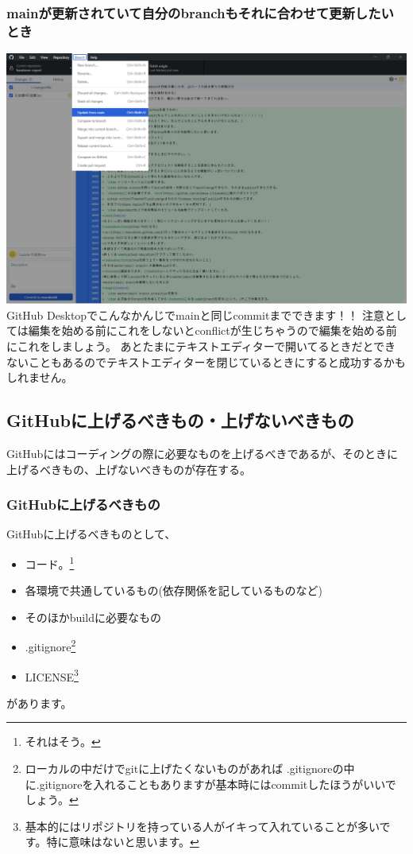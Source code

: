 \documentclass[dvipdfmx,jb5]{jarticle}
\begin{document}
\subsubsection{mainが更新されていて自分のbranchもそれに合わせて更新したいとき}
\includegraphics[width=15cm]{assets/update-branch.png}\\
GitHub Desktopでこんなかんじでmainと同じcommitまでできます！！
注意としては編集を始める前にこれをしないとconflictが生じちゃうので編集を始める前にこれをしましょう。
あとたまにテキストエディターで開いてるときだとできないこともあるのでテキストエディターを閉じているときにすると成功するかもしれません。
\subsection{GitHubに上げるべきもの・上げないべきもの}
GitHubにはコーディングの際に必要なものを上げるべきであるが、そのときに上げるべきもの、上げないべきものが存在する。
\subsubsection{GitHubに上げるべきもの}
GitHubに上げるべきものとして、
\begin{itemize}
  \item コード。\footnote{それはそう。}
  \item 各環境で共通しているもの(依存関係を記しているものなど)
  \item そのほかbuildに必要なもの
  \item .gitignore\footnote{ローカルの中だけでgitに上げたくないものがあれば
  .gitignoreの中に.gitignoreを入れることもありますが基本時にはcommitしたほうがいいでしょう。
  }
  \item LICENSE\footnote{基本的にはリポジトリを持っている人がイキって入れていることが多いです。特に意味はないと思います。}
\end{itemize}
があります。
\end{document}
